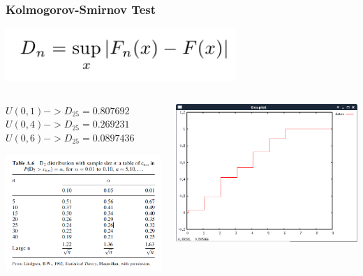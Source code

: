 \documentclass{beamer}
\begin{document}
\begin{frame}
\frametitle{Kolmogorov-Smirnov Test}
\begin{center}
\includegraphics[scale=0.35]{kst1}
\end{center}
\begin{columns}
\begin{column}{0.5\textwidth}
\begin{center}
$U(0,1) -> D_{25} = 0.807692$
$U(0,4) -> D_{25} = 0.269231$
$U(0,6) -> D_{25} = 0.0897436$
\end{center}
\includegraphics[scale=0.38]{kst2}
\end{column}
\begin{column}{0.5\textwidth}
\includegraphics[scale=0.25]{kst3}
\end{column}
\end{columns}
\end{frame}
\end{document}
